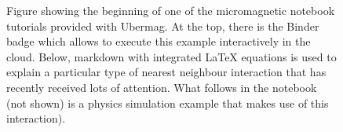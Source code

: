 \documentclass{deliverablereport}
\begin{document}
\begin{figure}
  \centering
  \vspace*{2cm}
  \caption{Figure showing the beginning of one of the micromagnetic
    notebook tutorials provided with Ubermag. At the top, there is the Binder
    badge which allows to execute this example interactively in the
    cloud. Below, markdown with integrated LaTeX equations is used to
    explain a particular type of nearest neighbour interaction that
    has recently received lots of attention. What follows in the
    notebook (not shown) is a physics simulation example that makes
    use of this interaction).  }
  \vspace*{2cm}
  \label{fig:demo1}
\end{figure}
\end{document}
